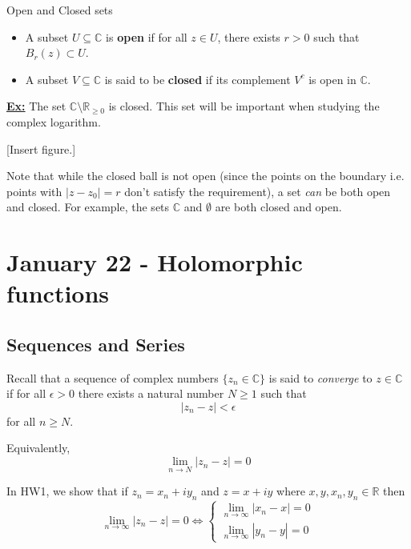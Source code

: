 \documentclass{article}
\newcommand{\R}{\mathbb{R}}
\newcommand{\C}{\mathbb{C}}
\begin{document}
\vskip 0.5cm
\begin{mathdefinitionbox}{Open and Closed sets}
\vskip 0.5cm
  \begin{itemize}
    \item A subset $U \subseteq \C$ is \textbf{open} if for all $z \in U$, there exists $r > 0$ such that $B_r (z) \subset U$.
    
    \item A subset $V \subseteq \C$ is said to be \textbf{closed} if its complement $V^c$ is open in $\C$.
  \end{itemize}
\end{mathdefinitionbox}



\vskip 0.5cm
\underline{\textbf{Ex:}} The set $\C \setminus \R_{\geq 0}$ is closed. This set will be important when studying the complex logarithm.


[Insert figure.]

\vskip 0.5cm
Note that while the closed ball is not open (since the points on the boundary i.e. points with $|z - z_0| = r$ don't satisfy the requirement), a set \emph{can} be both open and closed. For example, the sets $\C$ and $\emptyset$ are both closed and open.

\pagebreak

\section{January 22 - Holomorphic functions}

\vskip 1cm
\subsection{Sequences and Series}

\vskip 0.5cm
Recall that a sequence of complex numbers $\{z_n \in \C\}$ is said to \emph{converge} to $z \in \C$ if for all $\epsilon > 0$ there exists a natural number $N \geq 1$ such that 
\[ |z_n - z| < \epsilon \] for all $n \geq N$.

Equivalently, 
\[ \lim_{n \rightarrow N} |z_n - z| = 0 \]
\begin{dottedbox}
  In HW1, we show that if $z_n = x_n + iy_n$ and $z = x + iy$ where $x, y, x_n, y_n \in \R$ then
  \[ \lim_{n \rightarrow \infty} |z_n - z| = 0 \iff \begin{cases}
    \lim_{n \rightarrow \infty} |x_n - x| = 0 \\
    \lim_{n \rightarrow \infty} |y_n - y| = 0
  \end{cases} \]
\end{dottedbox}
\end{document}
